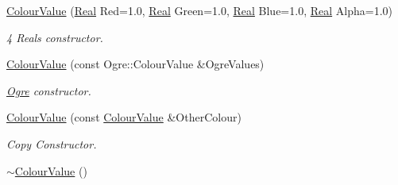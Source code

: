 \begin{DoxyCompactItemize}
\item 
\hyperlink{classMezzanine_1_1ColourValue_a75f43b4c3e540ccfe32b5770aa0d2676}{ColourValue} (\hyperlink{namespaceMezzanine_a726731b1a7df72bf3583e4a97282c6f6}{Real} Red=1.0, \hyperlink{namespaceMezzanine_a726731b1a7df72bf3583e4a97282c6f6}{Real} Green=1.0, \hyperlink{namespaceMezzanine_a726731b1a7df72bf3583e4a97282c6f6}{Real} Blue=1.0, \hyperlink{namespaceMezzanine_a726731b1a7df72bf3583e4a97282c6f6}{Real} Alpha=1.0)
\begin{DoxyCompactList}\small\item\em 4 Reals constructor. \item\end{DoxyCompactList}\item 
\hyperlink{classMezzanine_1_1ColourValue_a68d3605eed96bf7f8f969dcd06c736e4}{ColourValue} (const Ogre::ColourValue \&OgreValues)
\begin{DoxyCompactList}\small\item\em \hyperlink{namespaceOgre}{Ogre} constructor. \item\end{DoxyCompactList}\item 
\hyperlink{classMezzanine_1_1ColourValue_a75ed65fd1d1314ad15b40165eefbc3e6}{ColourValue} (const \hyperlink{classMezzanine_1_1ColourValue}{ColourValue} \&OtherColour)
\begin{DoxyCompactList}\small\item\em Copy Constructor. \item\end{DoxyCompactList}\item 
\hypertarget{classMezzanine_1_1ColourValue_a4bb04f63fb5f8d70e0606240e257133b}{
\hyperlink{classMezzanine_1_1ColourValue_a4bb04f63fb5f8d70e0606240e257133b}{$\sim$ColourValue} ()}
\label{classMezzanine_1_1ColourValue_a4bb04f63fb5f8d70e0606240e257133b}


\end{DoxyCompactItemize}
